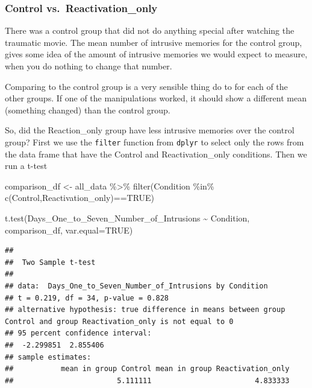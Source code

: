 \documentclass[
]{book}
\newenvironment{Shaded}{\begin{snugshade}}{\end{snugshade}}
\newcommand{\AttributeTok}[1]{\textcolor[rgb]{0.77,0.63,0.00}{#1}}
\newcommand{\ConstantTok}[1]{\textcolor[rgb]{0.00,0.00,0.00}{#1}}
\newcommand{\FunctionTok}[1]{\textcolor[rgb]{0.00,0.00,0.00}{#1}}
\newcommand{\NormalTok}[1]{#1}
\newcommand{\OtherTok}[1]{\textcolor[rgb]{0.56,0.35,0.01}{#1}}
\newcommand{\SpecialCharTok}[1]{\textcolor[rgb]{0.00,0.00,0.00}{#1}}
\newcommand{\StringTok}[1]{\textcolor[rgb]{0.31,0.60,0.02}{#1}}
\begin{document}
\hypertarget{control-vs.-reactivation_only}{%
\subsubsection{Control vs.~Reactivation\_only}\label{control-vs.-reactivation_only}}

There was a control group that did not do anything special after watching the traumatic movie. The mean number of intrusive memories for the control group, gives some idea of the amount of intrusive memories we would expect to measure, when you do nothing to change that number.

Comparing to the control group is a very sensible thing do to for each of the other groups. If one of the manipulations worked, it should show a different mean (something changed) than the control group.

So, did the Reaction\_only group have less intrusive memories over the control group? First we use the \texttt{filter} function from \texttt{dplyr} to select only the rows from the data frame that have the Control and Reactivation\_only conditions. Then we run a t-test

\begin{Shaded}
\begin{Highlighting}[]
\NormalTok{comparison\_df }\OtherTok{\textless{}{-}}\NormalTok{ all\_data }\SpecialCharTok{\%\textgreater{}\%} 
                  \FunctionTok{filter}\NormalTok{(Condition }\SpecialCharTok{\%in\%} \FunctionTok{c}\NormalTok{(}\StringTok{\textquotesingle{}Control\textquotesingle{}}\NormalTok{,}\StringTok{\textquotesingle{}Reactivation\_only\textquotesingle{}}\NormalTok{)}\SpecialCharTok{==}\ConstantTok{TRUE}\NormalTok{)}
                        
\FunctionTok{t.test}\NormalTok{(Days\_One\_to\_Seven\_Number\_of\_Intrusions }\SpecialCharTok{\textasciitilde{}}\NormalTok{ Condition, }
\NormalTok{       comparison\_df,}
       \AttributeTok{var.equal=}\ConstantTok{TRUE}\NormalTok{)}
\end{Highlighting}
\end{Shaded}

\begin{verbatim}
## 
##  Two Sample t-test
## 
## data:  Days_One_to_Seven_Number_of_Intrusions by Condition
## t = 0.219, df = 34, p-value = 0.828
## alternative hypothesis: true difference in means between group Control and group Reactivation_only is not equal to 0
## 95 percent confidence interval:
##  -2.299851  2.855406
## sample estimates:
##           mean in group Control mean in group Reactivation_only 
##                        5.111111                        4.833333
\end{verbatim}
\end{document}
